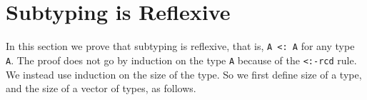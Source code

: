 \begin{fence}
\begin{code}%
\>[0]\AgdaSpace{}%
\AgdaSymbol{:}\AgdaSpace{}%
\AgdaSpace{}%
\AgdaSymbol{\{}\AgdaSpace{}%
\AgdaSymbol{\}}\AgdaSpace{}%
\AgdaSpace{}%
\AgdaSpace{}%
\AgdaSpace{}%
\AgdaSpace{}%
\AgdaSpace{}%
\AgdaSpace{}%
\AgdaSpace{}%
\AgdaSpace{}%
\AgdaSpace{}%
\AgdaSpace{}%
\AgdaSpace{}%
\AgdaSpace{}%
\AgdaSpace{}%
\AgdaSpace{}%
\AgdaSpace{}%
\AgdaSpace{}%
\AgdaSpace{}%
\<%
\\
\>[0]\AgdaSpace{}%
\AgdaSymbol{\{}\AgdaSymbol{\}\{}\AgdaSymbol{\}}\AgdaSpace{}%
\AgdaSpace{}%
\AgdaSpace{}%
\AgdaSpace{}%
\AgdaSpace{}%
\AgdaSymbol{=}\AgdaSpace{}%
\AgdaSpace{}%
\AgdaSymbol{:}\AgdaSpace{}%
\AgdaSpace{}%
\AgdaSymbol{\}\{}\AgdaSpace{}%
\AgdaSymbol{:}\AgdaSpace{}%
\AgdaSpace{}%
\AgdaSymbol{\}}\<%
\\
\>[0][@{}l@{\AgdaIndent{0}}]%
\>[4]\AgdaSpace{}%
\AgdaSpace{}%
\AgdaSpace{}%
\AgdaSpace{}%
\AgdaSpace{}%
\AgdaSpace{}%
\AgdaSpace{}%
%
\>[33]%
\>[36]\AgdaSpace{}%
\AgdaSpace{}%
\AgdaSpace{}%
\AgdaOperator{\AgdaDatatype{<:}}\AgdaSpace{}%
\AgdaSpace{}%
\AgdaSpace{}%
\AgdaSymbol{)}\<%
\end{code}
\end{fence}

\hypertarget{subtyping-is-reflexive}{%
\section{Subtyping is Reflexive}\label{subtyping-is-reflexive}}

In this section we prove that subtyping is reflexive, that is,
\texttt{A\ \textless{}:\ A} for any type \texttt{A}. The proof does not
go by induction on the type \texttt{A} because of the
\texttt{\textless{}:-rcd} rule. We instead use induction on the size of
the type. So we first define size of a type, and the size of a vector of
types, as follows.

